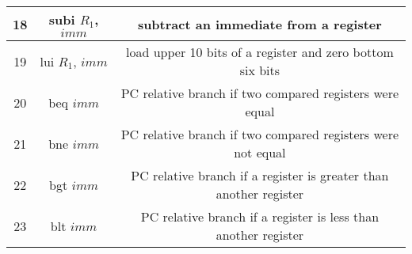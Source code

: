 \documentclass{article}
\begin{document}
\begin{par}
\begin{center}
\begin{tabular}{|c|c|c|}
			\hline
			18 & subi $ R_{1} $, $ imm $ & subtract an immediate from a register  \\
			\hline
			19 & lui $ R_{1} $, $ imm $ & load upper 10 bits of a register and zero bottom six bits \\
			\hline
			20 & beq $ imm $ & PC relative branch if two compared registers were equal \\
			\hline
			21 & bne $ imm $ & PC relative branch if two compared registers were not equal \\
			\hline
			22 & bgt $ imm $ & PC relative branch if a register is greater than another register \\
			\hline
			23 & blt $ imm $ & PC relative branch if a register is less than another register \\
			\hline
		\end{tabular}
	\end{center}
\end{par}
\end{document}
